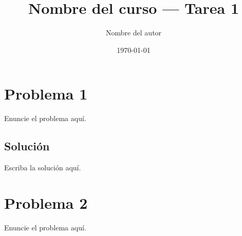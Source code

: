 \documentclass[11pt]{article}
\title{Nombre del curso — Tarea 1}
\author{Nombre del autor}
\date{\today}
\begin{document}
\maketitle

\section*{Problema 1}
Enuncie el problema aquí.

\subsection*{Solución}
Escriba la solución aquí.

\section*{Problema 2}
Enuncie el problema aquí.
\end{document}
